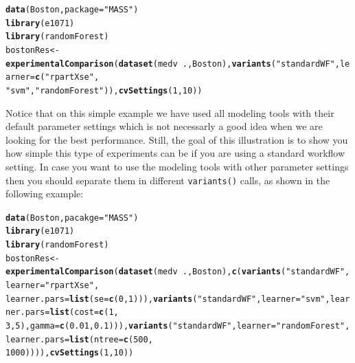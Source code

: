 \documentclass[10pt,a4paper]{article}\usepackage[]{graphicx}\usepackage[]{color}
\makeatletter
\newcommand{\hlnum}[1]{\textcolor[rgb]{0.686,0.059,0.569}{#1}}%
\newcommand{\hlstr}[1]{\textcolor[rgb]{0.192,0.494,0.8}{#1}}%
\newcommand{\hlopt}[1]{\textcolor[rgb]{0,0,0}{#1}}%
\newcommand{\hlstd}[1]{\textcolor[rgb]{0.345,0.345,0.345}{#1}}%
\newcommand{\hlkwb}[1]{\textcolor[rgb]{0.69,0.353,0.396}{#1}}%
\newcommand{\hlkwc}[1]{\textcolor[rgb]{0.333,0.667,0.333}{#1}}%
\newcommand{\hlkwd}[1]{\textcolor[rgb]{0.737,0.353,0.396}{\textbf{#1}}}%
\newenvironment{kframe}{%
 \def\at@end@of@kframe{}%
 \ifinner\ifhmode%
  \def\at@end@of@kframe{\end{minipage}}%
  \begin{minipage}{\columnwidth}%
 \fi\fi%
 \def\FrameCommand##1{\hskip\@totalleftmargin \hskip-\fboxsep
 \colorbox{shadecolor}{##1}\hskip-\fboxsep
     \hskip-\linewidth \hskip-\@totalleftmargin \hskip\columnwidth}%
 \MakeFramed {\advance\hsize-\width
   \@totalleftmargin\z@ \linewidth\hsize
   \@setminipage}}%
 {\par\unskip\endMakeFramed%
 \at@end@of@kframe}
\newenvironment{knitrout}{}{} %
\makeatother
\begin{document}
\begin{knitrout}
\color{fgcolor}\begin{kframe}
\begin{alltt}
\hlkwd{data}\hlstd{(Boston,} \hlkwc{package} \hlstd{=} \hlstr{"MASS"}\hlstd{)}
\hlkwd{library}\hlstd{(e1071)}
\hlkwd{library}\hlstd{(randomForest)}
\hlstd{bostonRes} \hlkwb{<-} \hlkwd{experimentalComparison}\hlstd{(}\hlkwd{dataset}\hlstd{(medv} \hlopt{~} \hlstd{., Boston),} \hlkwd{variants}\hlstd{(}\hlstr{"standardWF"}\hlstd{,} \hlkwc{learner} \hlstd{=} \hlkwd{c}\hlstd{(}\hlstr{"rpartXse"}\hlstd{,}
    \hlstr{"svm"}\hlstd{,} \hlstr{"randomForest"}\hlstd{)),} \hlkwd{cvSettings}\hlstd{(}\hlnum{1}\hlstd{,} \hlnum{10}\hlstd{))}
\end{alltt}
\end{kframe}
\end{knitrout}


Notice that on this simple example we have used all modeling tools
with their default parameter settings which is not necessarly a good
idea when we are looking for the best performance. Still, the goal of
this illustration is to show you how simple this type of experiments
can be if you are using a standard workflow setting. In case you want
to use the modeling tools with other parameter settings then you
should separate them in different \texttt{variants()} calls, as shown
in the following example:

\begin{knitrout}
\color{fgcolor}\begin{kframe}
\begin{alltt}
\hlkwd{data}\hlstd{(Boston,} \hlkwc{pacakge} \hlstd{=} \hlstr{"MASS"}\hlstd{)}
\hlkwd{library}\hlstd{(e1071)}
\hlkwd{library}\hlstd{(randomForest)}
\hlstd{bostonRes} \hlkwb{<-} \hlkwd{experimentalComparison}\hlstd{(}\hlkwd{dataset}\hlstd{(medv} \hlopt{~} \hlstd{., Boston),} \hlkwd{c}\hlstd{(}\hlkwd{variants}\hlstd{(}\hlstr{"standardWF"}\hlstd{,} \hlkwc{learner} \hlstd{=} \hlstr{"rpartXse"}\hlstd{,}
    \hlkwc{learner.pars} \hlstd{=} \hlkwd{list}\hlstd{(}\hlkwc{se} \hlstd{=} \hlkwd{c}\hlstd{(}\hlnum{0}\hlstd{,} \hlnum{1}\hlstd{))),} \hlkwd{variants}\hlstd{(}\hlstr{"standardWF"}\hlstd{,} \hlkwc{learner} \hlstd{=} \hlstr{"svm"}\hlstd{,} \hlkwc{learner.pars} \hlstd{=} \hlkwd{list}\hlstd{(}\hlkwc{cost} \hlstd{=} \hlkwd{c}\hlstd{(}\hlnum{1}\hlstd{,}
    \hlnum{3}\hlstd{,} \hlnum{5}\hlstd{),} \hlkwc{gamma} \hlstd{=} \hlkwd{c}\hlstd{(}\hlnum{0.01}\hlstd{,} \hlnum{0.1}\hlstd{))),} \hlkwd{variants}\hlstd{(}\hlstr{"standardWF"}\hlstd{,} \hlkwc{learner} \hlstd{=} \hlstr{"randomForest"}\hlstd{,} \hlkwc{learner.pars} \hlstd{=} \hlkwd{list}\hlstd{(}\hlkwc{ntree} \hlstd{=} \hlkwd{c}\hlstd{(}\hlnum{500}\hlstd{,}
    \hlnum{1000}\hlstd{)))),} \hlkwd{cvSettings}\hlstd{(}\hlnum{1}\hlstd{,} \hlnum{10}\hlstd{))}
\end{alltt}
\end{kframe}
\end{knitrout}
\end{document}
